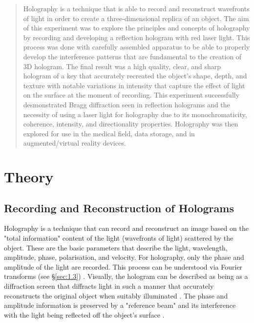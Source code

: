 \documentclass[12pt]{article}
\begin{document}
\begin{abstract}

Holography is a technique that is able to record and reconstruct wavefronts of light in order to create a three-dimensional replica of an object. The aim of this experiment was to explore
the principles and concepts of holography by recording and developing a reflection hologram with red laser light. This process was done with carefully assembled apparatus to be able to properly develop the 
interference patterns that are fundamental to the creation of 3D hologram. The final result was a high quality, clear, and sharp hologram of a key that accurately recreated the object's shape, depth, and texture
with notable variations in intensity that capture the effect of light on the surface at the moment of recording. This experiment successfully desmonstrated Bragg diffraction seen in reflection holograms and
the necessity of using a laser light for holography due to its monochromaticity, coherence, intensity, and directionality properties. Holography was then explored for use in the medical field, data storage, and in
augmented/virtual reality devices.

 
\end{abstract}


\vspace{4.5cm}

\section{Theory} \label{sec:1}

\subsection{Recording and Reconstruction of Holograms}

Holography is a technique that can record and reconstruct an image based on the "total information" content of the light (wavefronts of light) scattered by the object. These are the basic parameters that describe the light,
wavelength, amplitude, phase, polarisation, and velocity. For holography, only the phase and amplitude of the light are recorded. This process can be understood via Fourier transforms (see §\ref{sec:1.3})
\cite{UCDholo,basicholo1,princetonholo,collier2013optical}.
Visually, the hologram can be described as being as a diffraction screen that diffracts light in such a manner that accurately reconstructs the original object when suitably illuminated
\cite{basicholo1}.
The phase and amplitude information is preserved by a "reference beam" and its interference with the light being reflected off the object's surface
\cite{UCDholo,princetonholo}.
\end{document}
